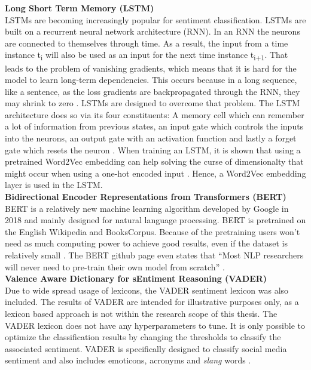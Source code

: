 \documentclass[11pt, a4paper]{article}
\begin{document}
\noindent\textbf{Long Short Term Memory (LSTM)}\\
LSTMs are becoming increasingly popular for sentiment classification. 
LSTMs are built on a recurrent neural network architecture (RNN). In an RNN the neurons are connected to themselves through time. 
As a result, the input from a time instance t\textsubscript{i} will also be used as an input for the next time instance t\textsubscript{i+1}. That leads to the 
problem of vanishing gradients, which means that it is hard for the model to learn long-term dependencies. This occurs because
in a long sequence, like a sentence, as the loss gradients are backpropagated through the RNN, they may shrink to zero \citep{vanishinggradients2020pmlr}.
LSTMs are designed to overcome that problem.
The LSTM architecture does so via its four constituents: A memory cell which can remember a lot of information 
from previous states, an input gate which controls the inputs into the neurons, an output gate with an activation function 
and lastly a forget gate which resets the neuron \citep{priyantina2019sentimentanalysishotel}. When training an LSTM, it is shown that
using a pretrained Word2Vec embedding can help solving the curse of dimensionalty that might occur when using a one-hot encoded input \citep{xiao2018word2veclstm}.
Hence, a Word2Vec embedding layer is used in the LSTM. \\

\noindent\textbf{Bidirectional Encoder Representations from Transformers (BERT)}\\
BERT is a relatively new machine learning algorithm developed by Google in 2018 and mainly designed for 
natural language processing. BERT is pretrained on the English Wikipedia and BooksCorpus. Because of the 
pretraining users won't need as much computing power to achieve good results, even if the dataset is relatively 
small \citep{devlin2019bert}. The BERT github page even states that 
“Most NLP researchers will never need to pre-train their own model from scratch” \citep{googlegithub}.\\

\noindent\textbf{Valence Aware Dictionary for sEntiment Reasoning (VADER)}\\
Due to wide spread usage of lexicons, the VADER sentiment lexicon was also included. The results of VADER are intended for illustrative purposes only,
as a lexicon based approach is not within the research scope of this thesis.
The VADER lexicon does not have any hyperparameters to tune. It is only possible to optimize the classification results by
changing the thresholds to classify the associated sentiment.
VADER is specifically designed to classify social media sentiment and also includes emoticons, acronyms and \emph{slang} words \citep{hutto2015vader}. \\
\end{document}
